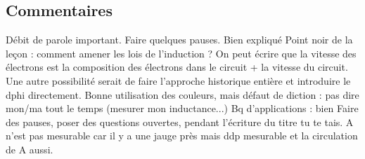 \begin{enumerate}
\subsection{Commentaires}

Débit de parole important. Faire quelques pauses.
Bien expliqué
Point noir de la leçon : comment amener les lois de l'induction ?
On peut écrire que la vitesse des électrons est la composition des électrons dans le circuit + la vitesse du circuit.
Une autre possibilité serait de faire l'approche historique entière et introduire le dphi directement.
Bonne utilisation des couleurs, mais défaut de diction : pas dire mon/ma tout le temps (mesurer mon inductance...)
Bq d'applications : bien
Faire des pauses, poser des questions ouvertes, pendant l'écriture du titre tu te tais.
A n'est pas mesurable car il y a une jauge près mais ddp mesurable et la circulation de A aussi.



\end{enumerate}